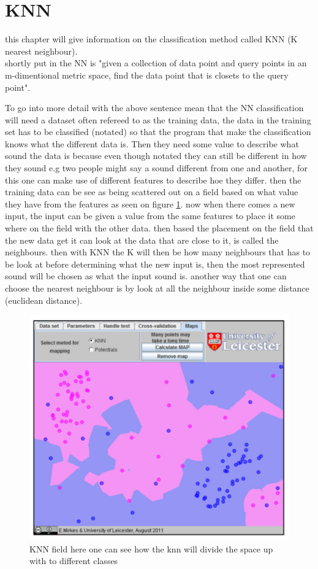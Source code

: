 \section{KNN}
this chapter will give information on the classification method called KNN (K nearest neighbour).\\
shortly put in \citep{meaningfulNN} the NN is "given a collection of data point and query points in an m-dimentional metric space, find the data point that is closets to the query point".


To go into more detail with the above sentence mean that the NN classification will need a dataset often refereed to as the training data, the data in the training set has to be classified (notated) so that the program that make the classification knows what the different data is. Then they need some value to describe what sound the data is  because even though notated they can still be different in how they sound e.g two people might say a sound different from one and another, for this one can make use of different features to describe hoe they differ. then the training data can be see as being scattered out on a field based on what value they have from the features as seen on figure \ref{KNN fig}. now when there comes a new input, the input can be given a value from the same features to place it some where on the field with the other data. then based the placement on the field that the new data get it can look at the data that are close to it, is called the neighbours. then with KNN the K will then be how many neighbours that has to be look at before determining what the new input is, then the most represented sound will be chosen as what the input sound is. another way that one can choose the nearest neighbour is by look at all the neighbour inside some distance (euclidean distance)\citep{NNHD}.
\begin{figure}[h]
	\begin{center}
		\includegraphics[scale = 0.5]{fig/KNNfig.jpg}
		\caption{KNN field here one can see how the knn will divide the space up with to different classes \citep{introKNN}}
		\label{KNN fig}
	\end{center}
\end{figure}
